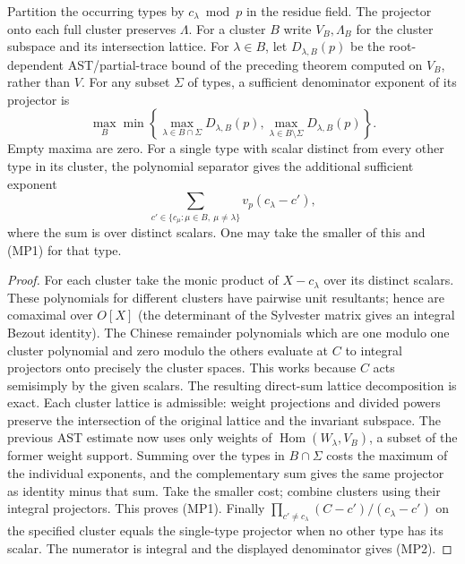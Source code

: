 \begin{theorem}
\label{thm:projector-central-clusters}
Partition the occurring types by \(c_\lambda\bmod p\) in the
residue field. The projector onto each full cluster preserves
\(\Lambda\). For a cluster \(B\) write \(V_B,\Lambda_B\) for the
cluster subspace and its intersection lattice.
For \(\lambda\in B\), let \(D_{\lambda,B}(p)\) be the
root-dependent AST/partial-trace bound of the preceding theorem
computed on \(V_B\), rather than \(V\).
For any subset \(\Sigma\) of types, a sufficient denominator
exponent of its projector is
\[
 \max_B\min\left\{
   \max_{\lambda\in B\cap\Sigma}D_{\lambda,B}(p),
   \max_{\lambda\in B\setminus\Sigma}D_{\lambda,B}(p)\right\}.
                                                               \tag{MP1}
\]
Empty maxima are zero. For a single type with scalar distinct
from every other type in its cluster, the polynomial separator
gives the additional sufficient exponent
\[
       \sum_{c'\in\{c_\mu:\mu\in B,\ \mu\ne\lambda\}}
                                      v_p(c_\lambda-c'),       \tag{MP2}
\]
where the sum is over distinct scalars. One may take the
smaller of this and (MP1) for that type.
\end{theorem}
\begin{proof}
For each cluster take the monic product of \(X-c_\lambda\)
over its distinct scalars. These polynomials for different
clusters have pairwise unit resultants; hence are comaximal
over \(O[X]\) (the determinant of the Sylvester matrix gives
an integral Bezout identity). The Chinese remainder polynomials
which are one modulo one cluster polynomial and zero modulo the
others evaluate at \(C\) to integral projectors onto precisely
the cluster spaces. This works because \(C\) acts semisimply by
the given scalars. The resulting direct-sum lattice
decomposition is exact. Each cluster lattice is admissible:
weight projections and divided powers preserve the intersection
of the original lattice and the invariant subspace.
The previous AST estimate now uses only weights of
\(\operatorname{Hom}(W_\lambda,V_B)\), a subset of the former
weight support. Summing over the types in \(B\cap\Sigma\)
costs the maximum of the individual exponents, and the
complementary sum gives the same projector as identity minus
that sum. Take the smaller cost; combine clusters using their
integral projectors. This proves (MP1). Finally
\(\prod_{c'\ne c_\lambda}(C-c')/(c_\lambda-c')\)
on the specified cluster equals the single-type projector
when no other type has its scalar. The numerator is integral
and the displayed denominator gives (MP2).
\end{proof}

